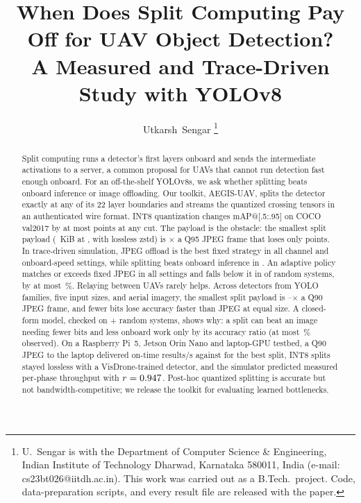\documentclass[journal,twocolumn,10pt]{IEEEtran}
\begin{document}
\title{When Does Split Computing Pay Off for UAV Object Detection?\\A Measured and Trace-Driven Study with YOLOv8}

\author{Utkarsh~Sengar%
\thanks{U.~Sengar is with the Department of Computer Science \& Engineering, Indian Institute of Technology Dharwad, Karnataka 580011, India (e-mail: cs23bt026@iitdh.ac.in). This work was carried out as a B.Tech.\ project. Code, data-preparation scripts, and every result file are released with the paper.}}


\maketitle

\begin{abstract}
Split computing runs a detector's first layers onboard and sends the intermediate activations to a server, a common proposal for UAVs that cannot run detection fast enough onboard. For an off-the-shelf YOLOv8s, we ask whether splitting beats onboard inference or image offloading. Our toolkit, AEGIS-UAV, splits the detector exactly at any of its 22 layer boundaries and streams the quantized crossing tensors in an authenticated wire format. INT8 quantization changes mAP@[.5:.95] on COCO val2017 by at most \MaxAbsDeltaINT{} points at any cut. The payload is the obstacle: the smallest split payload (\MinSplitKiB{}~KiB at \MinSplitCut{}, with lossless zstd) is \RatioMinSplitOverJPEGQNinetyFive$\times$ a Q95 JPEG frame that loses only \JPEGDeltaQNinetyFive{} points. In trace-driven simulation, JPEG offload is the best fixed strategy in all \NumCells{} channel and onboard-speed settings, while splitting beats onboard inference in \SplitBeatsOnboardCells{}. An adaptive policy matches or exceeds fixed JPEG in all \NumCells{} settings and falls below it in \GenAdaptiveBelowJpegN{} of \GenAdaptiveScenariosN{} random systems, by at most \GenAdaptiveVsJpegWorstPct\,\%. Relaying between UAVs rarely helps. Across \GenNModels{} detectors from \GenNFamilies{} YOLO families, five input sizes, and aerial imagery, the smallest split payload is \GenRatioMin--\GenRatioMax$\times$ a Q90 JPEG frame, and fewer bits lose accuracy faster than JPEG at equal size. A closed-form model, checked on \GenNScenarios{} + \GenNSwarmScenarios{} random systems, shows why: a split can beat an image needing fewer bits and less onboard work only by its accuracy ratio (at most \GenMaxSplitGainPct\,\% observed). On a Raspberry Pi~5, Jetson Orin Nano and laptop-GPU testbed, a Q90 JPEG to the laptop delivered \HwJpegOnTime{} on-time results/s against \HwKOneOnTime{} for the best split, INT8 splits stayed lossless with a VisDrone-trained detector, and the simulator predicted measured per-phase throughput with $r=0.947$. Post-hoc quantized splitting is accurate but not bandwidth-competitive; we release the toolkit for evaluating learned bottlenecks.
\end{abstract}
\end{document}
